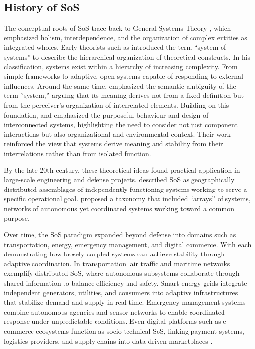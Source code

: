 \subsection{History of SoS}\label{subsec:background-sos-history}
The conceptual roots of SoS trace back to General Systems Theory \cite{von1950theory}, which emphasized holism, interdependence, and the organization of complex entities as integrated wholes. Early theorists such as \citet{boulding1956general} introduced the term “system of systems” to describe the hierarchical organization of theoretical constructs. In his classification, systems exist within a hierarchy of increasing complexity. From simple frameworks to adaptive, open systems capable of responding to external influences. Around the same time, \citet{jordan1960some} emphasized the semantic ambiguity of the term “system,” arguing that its meaning derives not from a fixed definition but from the perceiver’s organization of interrelated elements. Building on this foundation, \citet{ackoff1971towards} and \citet{jackson1984towards} emphasized the purposeful behaviour and design of interconnected systems, highlighting the need to consider not just component interactions but also organizational and environmental context. Their work reinforced the view that systems derive meaning and stability from their interrelations rather than from isolated function.

By the late 20th century, these theoretical ideas found practical application in large-scale engineering and defense projects. \citet{eisner1991computer} described SoS as geographically distributed assemblages of independently functioning systems working to serve a specific operational goal. \citet{shenhar19952} proposed a taxonomy that included “arrays” of systems, networks of autonomous yet coordinated systems working toward a common purpose.

Over time, the SoS paradigm expanded beyond defense into domains such as transportation, energy, emergency management, and digital commerce. With each demonstrating how loosely coupled systems can achieve stability through adaptive coordination. In transportation, air traffic and maritime networks exemplify distributed SoS, where autonomous subsystems collaborate through shared information to balance efficiency and safety. Smart energy grids integrate independent generators, utilities, and consumers into adaptive infrastructures that stabilize demand and supply in real time. Emergency management systems combine autonomous agencies and sensor networks to enable coordinated response under unpredictable conditions. Even digital platforms such as e-commerce ecosystems function as socio-technical SoS, linking payment systems, logistics providers, and supply chains into data-driven marketplaces \cite{nielsen2015systems}.

